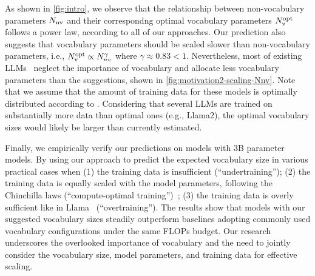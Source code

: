 As shown in \autoref{fig:intro}, we observe that the relationship between non-vocabulary parameters $N_{\rm nv}$ and their correspondng optimal vocabulary parameters $N_{\rm v}^{\rm opt}$ follows a power law, according to all of our approaches. 
Our prediction also suggests that vocabulary parameters should be scaled slower than non-vocabulary parameters, i.e., $N_{\rm v}^{\rm opt} \propto N_{nv}^{\gamma}$ where $\gamma \approx 0.83 < 1$. 
Nevertheless, most of existing LLMs~\citep{li2023starcoder,yang2024qwen2technicalreport,team2024gemma,metallama3blog,almazrouei2023falcon,groeneveld2024olmo,cai2024internlm2technicalreport,deepseekllm2024,nvidia2024nemotron4,zhang2024tinyllama} neglect the importance of vocabulary and allocate less vocabulary parameters than the suggestions, shown in \autoref{fig:motivation2-scaling-Nnv}. 
Note that we assume that the amount of training data for these models is optimally distributed according to \citet{hoffmann2022training}.
Considering that several LLMs are trained on substantially more data than optimal ones (e.g., Llama2), the optimal vocabulary sizes would likely be larger than currently estimated.

Finally, we empirically verify our predictions on models with 3B parameter models. By using our approach to predict the expected vocabulary size in various practical cases when (1) the training data is insufficient (``undertraining''); (2) the training data is equally scaled with the model parameters, following the Chinchilla laws (``compute-optimal training'')~\citep{hoffmann2022training}; (3) the training data is overly sufficient like in Llama~\citep{touvron2023llama} (``overtraining''). The results show that models with our suggested vocabulary sizes steadily outperform baselines adopting commonly used vocabulary configurations under the same FLOPs budget.
Our research underscores the overlooked importance of vocabulary and the need to jointly consider the vocabulary size, model parameters, and training data for effective scaling.
